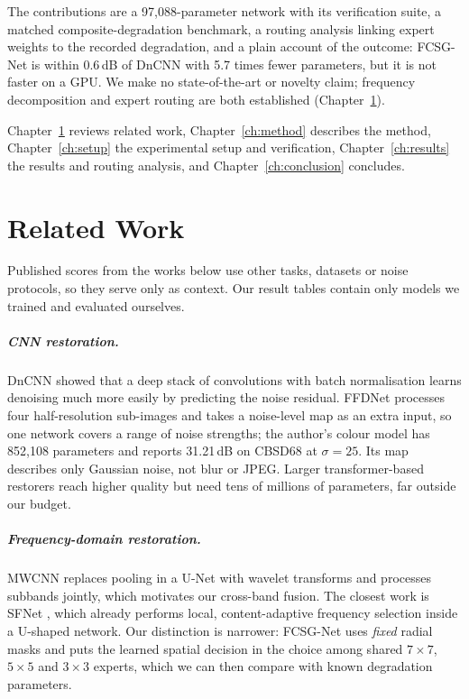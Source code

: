 \documentclass[12pt,a4paper,oneside]{NITR}
\newcommand{\fcsg}{FCSG-Net}
\newcommand{\dB}{\,dB}
\begin{document}
The contributions are a 97,088-parameter network with its verification
suite, a matched composite-degradation benchmark, a routing analysis linking
expert weights to the recorded degradation, and a plain account of the
outcome: \fcsg{} is within 0.6\dB{} of DnCNN with 5.7 times fewer parameters,
but it is not faster on a GPU. We make no state-of-the-art or novelty claim;
frequency decomposition and expert routing are both established
(Chapter~\ref{ch:literature}).

Chapter~\ref{ch:literature} reviews related work, Chapter~\ref{ch:method}
describes the method, Chapter~\ref{ch:setup} the experimental setup and
verification, Chapter~\ref{ch:results} the results and routing analysis, and
Chapter~\ref{ch:conclusion} concludes.


\chapter{Related Work}\label{ch:literature}

Published scores from the works below use other tasks, datasets or noise
protocols, so they serve only as context. Our result tables contain only
models we trained and evaluated ourselves.

\paragraph{CNN restoration.} DnCNN \cite{zhang2017dncnn} showed that a deep
stack of convolutions with batch normalisation learns denoising much more
easily by predicting the noise residual. FFDNet \cite{zhang2018ffdnet}
processes four half-resolution sub-images and takes a noise-level map as an
extra input, so one network covers a range of noise strengths; the author's
colour model has 852,108 parameters and reports 31.21\dB{} on CBSD68 at
$\sigma=25$. Its map describes only Gaussian noise, not blur or JPEG. Larger
transformer-based restorers reach higher quality but need tens of millions of
parameters, far outside our budget.

\paragraph{Frequency-domain restoration.} MWCNN \cite{liu2018mwcnn} replaces
pooling in a U-Net with wavelet transforms and processes subbands jointly,
which motivates our cross-band fusion. The closest work is SFNet
\cite{cui2023sfnet}, which already performs local, content-adaptive frequency
selection inside a U-shaped network. Our distinction is narrower: \fcsg{}
uses \emph{fixed} radial masks and puts the learned spatial decision in the
choice among shared $7\times7$, $5\times5$ and $3\times3$ experts, which we
can then compare with known degradation parameters.
\end{document}
